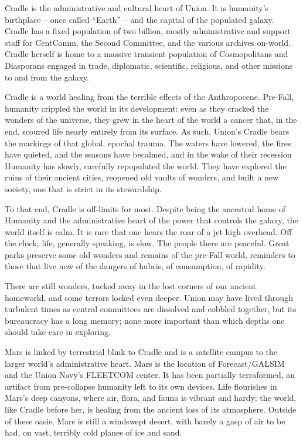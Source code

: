 Cradle is the administrative and cultural heart of Union. It is humanity’s birthplace -- once called
“Earth” -- and the capital of the populated galaxy. Cradle has a fixed population of two billion,
mostly administrative and support staff for CentComm, the Second Committee,  and the various
archives on-world. Cradle herself is home to a massive transient population of Cosmopolitans
and Diasporans engaged in trade, diplomatic, scientific, religious, and other missions to and from
the galaxy.


Cradle is a world healing from the terrible effects of the Anthropocene. Pre-Fall, humanity
crippled the world in its development: even as they cracked the wonders of the universe, they
grew in the heart of the world a cancer that, in the end, scoured life nearly entirely from its
surface. As such, Union’s Cradle bears the markings of that global, epochal trauma. The waters
have lowered, the fires have quieted, and the seasons have becalmed, and in the wake of their
recession Humanity has slowly, carefully repopulated the world. They have explored the ruins of
their ancient cities, reopened old vaults of wonders, and built a new society, one that is strict in
its stewardship.


To that end, Cradle is off-limits for most. Despite being the ancestral home of Humanity and the
administrative heart of the power that controls the galaxy, the world itself is calm. It is rare that
one hears the roar of a jet high overhead. Off the clock, life, generally speaking, is slow. The
people there are peaceful. Great parks preserve some old wonders and remains of the pre-Fall
world, reminders to those that live now of the dangers of hubris, of consumption, of rapidity.





There are still wonders, tucked away in the lost corners of our ancient homeworld, and some
terrors locked even deeper. Union may have lived through turbulent times as central committees
are dissolved and cobbled together, but its bureaucracy has a long memory; none more
important than which depths one should take care in exploring.


Mars is linked by terrestrial blink to Cradle and is a satellite campus to the larger world’s
administrative heart. Mars is the location of Forecast/GALSIM and the Union Navy’s FLEETCOM
center. It has been partially terraformed, an artifact from pre-collapse humanity left to its own
devices. Life flourishes in Mars’s deep canyons, where air, flora, and fauna is vibrant and hardy;
the world, like Cradle before her, is healing from the ancient loss of its atmosphere. Outside of
these oasis, Mars is still a windswept desert, with barely a gasp of air to be had, on vast, terribly
cold planes of ice and sand.


